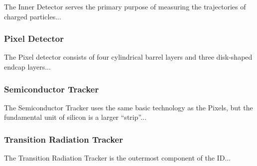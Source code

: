﻿The Inner Detector serves the primary purpose of measuring the trajectories of charged particles...

\subsubsection{Pixel Detector} \label{sec:pixel}

The Pixel detector consists of four cylindrical barrel layers and three disk-shaped endcap layers...

\subsubsection{Semiconductor Tracker} \label{sec:sct}

The Semiconductor Tracker uses the same basic technology as the Pixels, but the fundamental unit of silicon is a larger ``strip''...

\subsubsection{Transition Radiation Tracker} \label{sec:trt}

The Transition Radiation Tracker is the outermost component of the ID...
